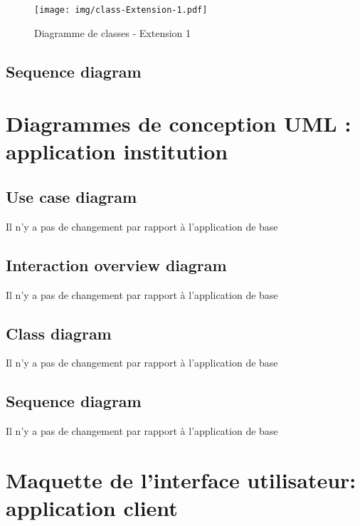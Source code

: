 \documentclass[]{report}
\begin{document}
\begin{figure}[h!]
	\centering\texttt{[image: img/class-Extension-1.pdf]}
	\caption{Diagramme de classes - Extension 1}
\end{figure}



\newpage

\subsection{Sequence diagram}



\newpage



\section{Diagrammes de conception UML : application institution}



\subsection{Use case diagram}

Il n'y a pas de changement par rapport à l'application de base


\subsection{Interaction overview diagram}

Il n'y a pas de changement par rapport à l'application de base

\subsection{Class diagram}

Il n'y a pas de changement par rapport à l'application de base

\subsection{Sequence diagram}

Il n'y a pas de changement par rapport à l'application de base

\newpage

\section{Maquette de l'interface utilisateur: application client}
\end{document}
